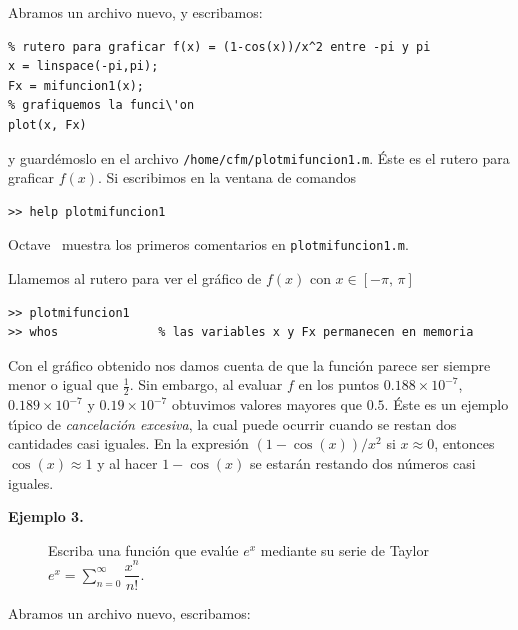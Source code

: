 \documentclass[letter,11pt]{article}
\newcommand\0{\mathbf{0}}
\newcommand{\octave}{{\sc Octave }}
\begin{document}
	Abramos un archivo nuevo, y es\-cri\-ba\-mos:
	
    \medskip

\begin{lstlisting}
% rutero para graficar f(x) = (1-cos(x))/x^2 entre -pi y pi
x = linspace(-pi,pi);
Fx = mifuncion1(x);
% grafiquemos la funci\'on
plot(x, Fx)
\end{lstlisting}

\medskip

y guard\'emoslo en el archivo \Verb+/home/cfm/plotmifuncion1.m+.	
\'Este es el rutero para graficar $f(x)$.
Si escribimos en la ventana de comandos

\medskip

\begin{lstlisting}		
>> help plotmifuncion1
\end{lstlisting}

\medskip

\octave\, muestra los primeros comentarios en \Verb+plotmifuncion1.m+.

Llamemos al rutero para ver el gr\'afico de $f(x)$
con $x \in [-\pi,\,\pi]$

\medskip

\begin{lstlisting}		
>> plotmifuncion1
>> whos              % las variables x y Fx permanecen en memoria
\end{lstlisting}

\medskip

Con el gr\'afico obtenido
nos damos cuenta de que la funci\'on parece ser siempre menor o igual que $\frac 1 2.$
Sin embargo, al evaluar $f$ en los puntos $0.188 \times 10^{-7}$, $0.189\times 10^{-7}$ y
$0.19\times 10^{-7}$ obtuvimos valores mayores que $0.5$.
\'Este es un ejemplo t\'{\i}pico de {\em cancelaci\'on excesiva}, la cual puede ocurrir
cuando se restan dos cantidades casi iguales. En la expresi\'on $(1-\cos(x))/x^2$
si $x \approx 0$, entonces $\cos(x) \approx 1$ y al hacer $1-\cos(x)$ se estar\'an restando dos
n\'umeros casi iguales.

\begin{description}
\item[\textbf{Ejemplo 3.}] Escriba una funci\'on que eval\'ue $e^x$ mediante su serie de Taylor $\displaystyle e^x=\sum_{n=0}^{\infty} \dfrac{x^n}{n!}$.
\end{description}

Abramos un archivo nuevo, es\-cri\-ba\-mos:

\medskip
\end{document}
